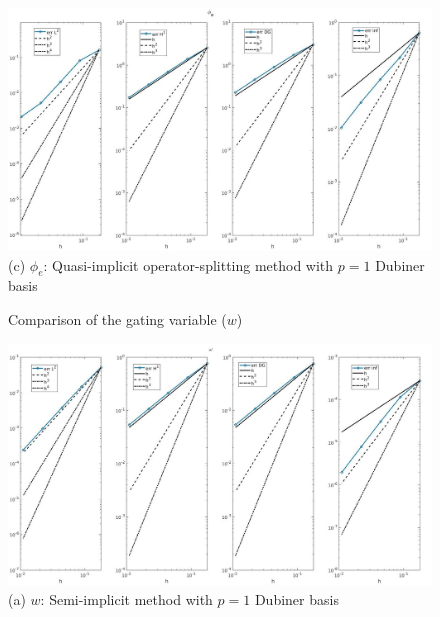 \documentclass[a4paper,11pt]{article}
\begin{document}
\begin{figure}[h]
\begin{center}
\includegraphics[width =\textwidth]{./errors/D1_Phie_1_OS.jpg}
\caption*{(c) $\phi_e$: Quasi-implicit operator-splitting method with $p=1$ Dubiner basis}
\end{center}
\end{figure}

\begin{figure}[H]
\caption{Comparison of the gating variable ($w$)}
\label{w-time}
\begin{center}
\includegraphics[width = \textwidth]{./errors/D1_w_1.jpg}
\caption*{(a) $w$: Semi-implicit method with $p=1$ Dubiner basis}
\end{center}
\end{figure}
\newpage
\end{document}
